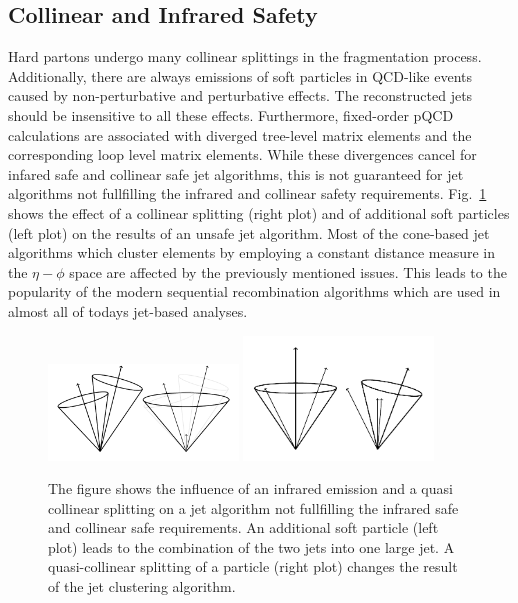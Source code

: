 \subsection{Collinear and Infrared Safety}
\label{sec:coll_safety}

Hard partons undergo many collinear splittings in the fragmentation process.
Additionally, there are always emissions of soft particles in QCD-like events
caused by non-perturbative and perturbative effects. The reconstructed jets
should be insensitive to all these effects. Furthermore, fixed-order pQCD
calculations are associated with diverged tree-level matrix elements and the
corresponding loop level matrix elements. While these divergences cancel for
infared safe and collinear safe jet algorithms, this is not guaranteed for jet
algorithms not fullfilling the infrared and collinear safety requirements.
Fig.~\ref{fig:infrared_safety} shows the effect of a collinear splitting (right
plot) and of additional soft particles (left plot) on the results of an unsafe
jet algorithm. Most of the cone-based jet algorithms which cluster elements
by employing a constant distance measure in the $\eta-\phi$ space are affected by the
previously mentioned issues. This leads to the popularity of the modern sequential
recombination algorithms which are used in almost all of todays jet-based
analyses.

\begin{figure}[htb]
    \centering
    \includegraphics[width=0.45\textwidth]{figures/drawings/infrared_safety/jetinfrared.pdf}\hfill
    \includegraphics[width=0.45\textwidth]{figures/drawings/infrared_safety/jetcollinear.pdf}
    \caption{The figure shows the influence of an infrared emission and a quasi
        collinear splitting on a jet algorithm not fullfilling the infrared safe
        and collinear safe requirements. An additional soft particle (left plot)
    leads to the combination of the two jets into one large jet. A
quasi-collinear splitting of a particle (right plot) changes the result of the
jet clustering algorithm.}
    \label{fig:infrared_safety}
\end{figure}

